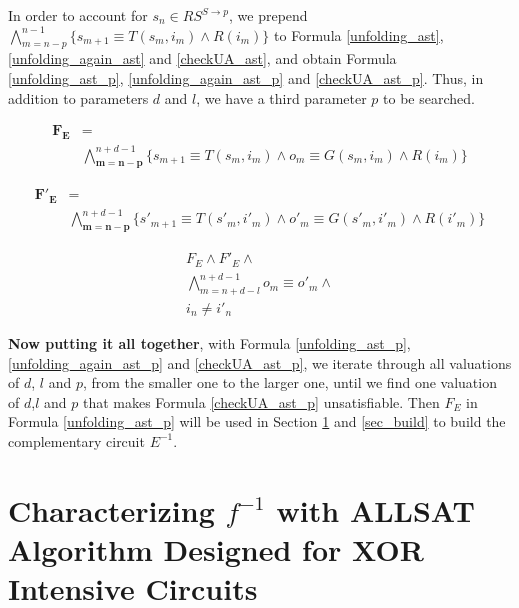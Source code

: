 \documentclass[journal]{IEEEtran}
\begin{document}
In order to account for $s_n\in RS^{S\to p}$,
we prepend $\bigwedge_{m=n-p}^{n-1}\big\{s_{m+1}\equiv T(s_m,i_m)\wedge R(i_m)\big\}$ to Formula \ref{unfolding_ast},\ref{unfolding_again_ast} and \ref{checkUA_ast},
and obtain Formula \ref{unfolding_ast_p}, \ref{unfolding_again_ast_p} and \ref{checkUA_ast_p}.
Thus,
in addition to parameters $d$ and $l$,
we have a third parameter $p$ to be searched.

\begin{equation}\label{unfolding_ast_p}
\begin{split}
\boldsymbol{F_E} &= \\
&
\bigwedge_{\boldsymbol{m=n-p}}^{n+d-1}
\Big\{
s_{m+1}\equiv T(s_m,i_m) \wedge
o_m\equiv G(s_m,i_m) \wedge
R (i_m)
\Big\}
\end{split}
\end{equation}

\begin{equation}\label{unfolding_again_ast_p}
\begin{split}
\boldsymbol{F'_E} &= \\
&
\bigwedge_{\boldsymbol{m=n-p}}^{n+d-1}
\Big\{
s'_{m+1}\equiv T(s'_m,i'_m) \wedge
o'_m\equiv G(s'_m,i'_m) \wedge
R (i'_m)
\Big\}
\end{split}
\end{equation}

\begin{equation}\label{checkUA_ast_p}
\begin{array}{c}
F_E\wedge F'_E \wedge \\
\bigwedge_{m=n+d-l}^{n+d-1}o_m\equiv o'_m\wedge \\
i_n\ne i'_n
\end{array}
\end{equation}

\textbf{Now putting it all together},
with Formula \ref{unfolding_ast_p}, \ref{unfolding_again_ast_p} and \ref{checkUA_ast_p},
we iterate through all valuations of $d$, $l$ and $p$,
from the smaller one to the larger one,
until we find one valuation of $d$,$l$ and $p$ that makes Formula \ref{checkUA_ast_p} unsatisfiable.
Then $F_E$ in Formula \ref{unfolding_ast_p} will be used in Section \ref{sec_buildF} and \ref{sec_build} to build the complementary circuit $E^{-1}$.

\section{Characterizing $f^{-1}$ with ALLSAT Algorithm Designed for XOR Intensive Circuits}\label{sec_buildF}
\end{document}
